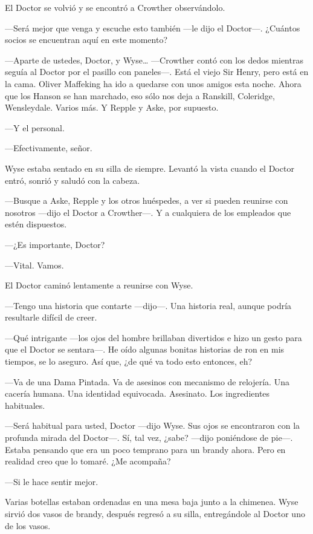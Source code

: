 {El Doctor se volvió y se encontró a Crowther observándolo.}

{---Será mejor que venga y escuche esto también ---le dijo el Doctor---.
¿Cuántos socios se encuentran aquí en este momento?}

{---Aparte de ustedes, Doctor, y Wyse\ldots{} ---Crowther contó con los
	dedos mientras seguía al Doctor por el pasillo con paneles---. Está el
	viejo Sir Henry, pero está en la cama. Oliver Maffeking ha ido a
	quedarse con unos amigos esta noche. Ahora que los Hanson se han
	marchado, eso sólo nos deja a Ranskill, Coleridge, Wensleydale. Varios
más. Y Repple y Aske, por supuesto.}

{---Y el personal.}

{---Efectivamente, señor.}

{Wyse estaba sentado en su silla de siempre. Levantó la vista cuando el
Doctor entró, sonrió y saludó con la cabeza.}

{---Busque a Aske, Repple y los otros huéspedes, a ver si pueden
	reunirse con nosotros ---dijo el Doctor a Crowther---. Y a cualquiera de
los empleados que estén dispuestos.}

{---¿Es importante, Doctor?}

{---Vital. Vamos.}

{El Doctor caminó lentamente a reunirse con Wyse.}

{---Tengo una historia que contarte ---dijo---. Una historia real,
aunque podría resultarle difícil de creer.}

{---Qué intrigante ---los ojos del hombre brillaban divertidos e hizo un
	gesto para que el Doctor se sentara---. He oído algunas bonitas
	historias de ron en mis tiempos, se lo aseguro. Así que, ¿de qué va todo
esto entonces, eh?}

{---Va de una Dama Pintada. Va de asesinos con mecanismo de relojería.
	Una cacería humana. Una identidad equivocada. Asesinato. Los
ingredientes habituales.}

{---Será habitual para usted, Doctor ---dijo Wyse. Sus ojos se
	encontraron con la profunda mirada del Doctor---. Sí, tal vez, ¿sabe?
	---dijo poniéndose de pie---. Estaba pensando que era un poco temprano
	para un brandy ahora. Pero en realidad creo que lo tomaré. ¿Me
acompaña?}

{---Si le hace sentir mejor.}

{Varias botellas estaban ordenadas en una mesa baja junto a la chimenea.
	Wyse sirvió dos vasos de brandy, después regresó a su silla,
entregándole al Doctor uno de los vasos.}

